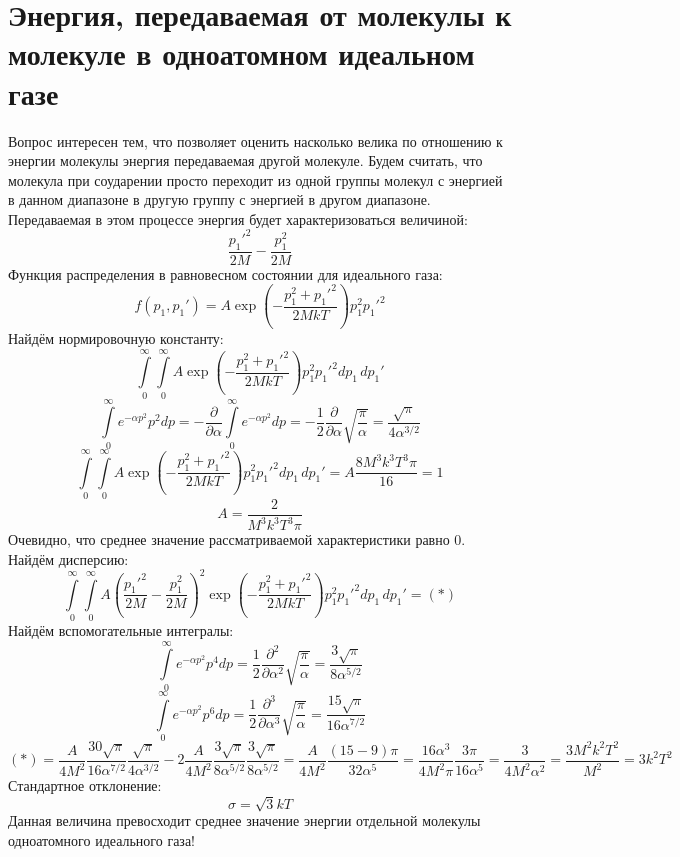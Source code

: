 \section{Энергия, передаваемая от молекулы к молекуле в одноатомном идеальном газе}

Вопрос интересен тем, что позволяет оценить насколько велика по отношению к энергии молекулы энергия передаваемая другой молекуле. Будем считать, что молекула при соударении просто переходит из одной группы молекул с энергией в данном диапазоне в другую группу с энергией в другом диапазоне. Передаваемая в этом процессе энергия будет характеризоваться величиной:
\[
	\frac{p_1'^2}{2M} - \frac{p_1^2}{2M}
\] 
Функция распределения в равновесном состоянии для идеального газа:
\[
	f(p_1, p_1') = 
	A \exp \left(
	- \frac{p_1^2 + p_1'^2}{2MkT}
	\right)	p_1^2 p_1'^2
\]
Найдём нормировочную константу:
\[
	\int\limits_0^\infty \! \int\limits_0^\infty 
	A \exp \left(
	- \frac{p_1^2 + p_1'^2}{2MkT}
	\right)	p_1^2 p_1'^2 dp_1\,dp_1'
\]
\[
	\int\limits_0^\infty e^{- \alpha p^2} p^2 dp = 
	- \frac{\partial}{\partial \alpha} \int\limits_0^\infty e^{- \alpha p^2} dp
	= - \frac{1}{2} \frac{\partial}{\partial \alpha} \sqrt{\frac{\pi}{\alpha}}
	= \frac{\sqrt{\pi}}{4\alpha^{3/2}}
\]
\[
	\int\limits_0^\infty \! \int\limits_0^\infty 
	A \exp \left(
	- \frac{p_1^2 + p_1'^2}{2MkT}
	\right)	p_1^2 p_1'^2 dp_1\,dp_1'
	=
	A \frac{8M^3k^3T^3\pi}{16} = 1
\]
\[
	A = \frac{2}{M^3k^3T^3\pi}
\]
Очевидно, что среднее значение рассматриваемой характеристики равно 0. Найдём дисперсию:
\[
	\int\limits_0^\infty \! \int\limits_0^\infty 
	A \left(\frac{p_1'^2}{2M} - \frac{p_1^2}{2M}\right)^2\exp \left(
	- \frac{p_1^2 + p_1'^2}{2MkT}
	\right)	p_1^2 p_1'^2 dp_1\,dp_1' = (*)
\]
Найдём вспомогательные интегралы:
\[
	\int\limits_0^\infty e^{- \alpha p^2} p^4 dp = 
	\frac{1}{2} \frac{\partial^2}{\partial \alpha^2} \sqrt{\frac{\pi}{\alpha}} =
	\frac{3\sqrt{\pi}}{8\alpha^{5/2}}
\]
\[
	\int\limits_0^\infty e^{- \alpha p^2} p^6 dp = 
	\frac{1}{2} \frac{\partial^3}{\partial \alpha^3} \sqrt{\frac{\pi}{\alpha}} =
	\frac{15\sqrt{\pi}}{16\alpha^{7/2}}
\]
\[
	(*) = \frac{A}{4M^2} \frac{30\sqrt{\pi}}{16\alpha^{7/2}} \frac{\sqrt{\pi}}{4\alpha^{3/2}} -
	2\frac{A}{4M^2} \frac{3\sqrt{\pi}}{8\alpha^{5/2}}\frac{3\sqrt{\pi}}{8\alpha^{5/2}}
	=
	\frac{A}{4M^2}  \frac{(15 - 9)\pi}{32\alpha^{5}} = 
	\frac{16\alpha^{3}}{4M^2\pi} \frac{3\pi}{16\alpha^{5}} =
	\frac{3}{4M^2\alpha^{2}} = 
	\frac{3M^2k^2T^2}{M^2} = 3 k^2 T^2
\]
Стандартное отклонение:
\[
	\sigma = \sqrt{3} kT
\]
Данная величина превосходит среднее значение энергии отдельной молекулы одноатомного идеального газа!